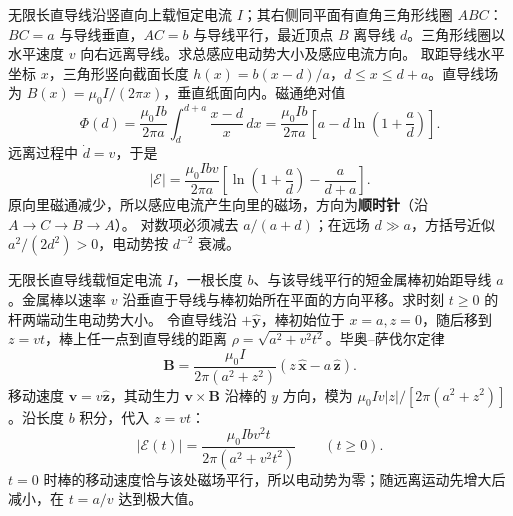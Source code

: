 \problemtext 无限长直导线沿竖直向上载恒定电流 $I$；其右侧同平面有直角三角形线圈 $ABC$：$BC=a$ 与导线垂直，$AC=b$ 与导线平行，最近顶点 $B$ 离导线 $d$。三角形线圈以水平速度 $v$ 向右远离导线。求总感应电动势大小及感应电流方向。
\workings 取距导线水平坐标 $x$，三角形竖向截面长度 $h(x)=b(x-d)/a$，$d\le x\le d+a$。直导线场为 $B(x)=\mu_0I/(2\pi x)$，垂直纸面向内。磁通绝对值
\[
\Phi(d)=\frac{\mu_0Ib}{2\pi a}
\int_d^{d+a}\frac{x-d}{x}\,dx
=\frac{\mu_0Ib}{2\pi a}
\left[a-d\ln\left(1+\frac ad\right)\right].
\]
远离过程中 $\dot d=v$，于是
\[
\boxed{|\mathcal E|=
\frac{\mu_0Ibv}{2\pi a}
\left[\ln\left(1+\frac ad\right)-\frac a{d+a}\right]}.
\]
原向里磁通减少，所以感应电流产生向里的磁场，方向为\textbf{顺时针}（沿 $A\to C\to B\to A$）。
\crosscheck 对数项必须减去 $a/(a+d)$；在远场 $d\gg a$，方括号近似 $a^2/(2d^2)>0$，电动势按 $d^{-2}$ 衰减。

\problemtext 无限长直导线载恒定电流 $I$，一根长度 $b$、与该导线平行的短金属棒初始距导线 $a$。金属棒以速率 $v$ 沿垂直于导线与棒初始所在平面的方向平移。求时刻 $t\ge0$ 的杆两端动生电动势大小。
\workings 令直导线沿 $+\hat{\bm y}$，棒初始位于 $x=a,z=0$，随后移到 $z=vt$，棒上任一点到直导线的距离 $\rho=\sqrt{a^2+v^2t^2}$。毕奥--萨伐尔定律
\[\bm B=\frac{\mu_0I}{2\pi(a^2+z^2)}
\left(z\,\hat{\bm x}-a\,\hat{\bm z}\right).\]
移动速度 $\bm v=v\hat{\bm z}$，其动生力 $\bm v\times\bm B$ 沿棒的 $y$ 方向，模为 $\mu_0 I v|z|/[2\pi(a^2+z^2)]$。沿长度 $b$ 积分，代入 $z=vt$：
\[
\boxed{|\mathcal E(t)|=
\frac{\mu_0I b v^2t}{2\pi(a^2+v^2t^2)}}\qquad(t\ge0).
\]
\crosscheck $t=0$ 时棒的移动速度恰与该处磁场平行，所以电动势为零；随远离运动先增大后减小，在 $t=a/v$ 达到极大值。
